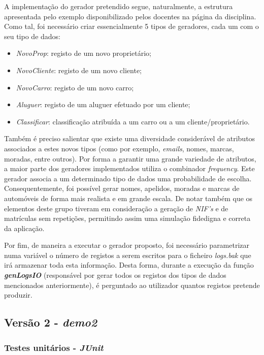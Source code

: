 \documentclass[a4paper]{report}
\begin{document}
A implementação do gerador pretendido segue, naturalmente, a estrutura apresentada pelo exemplo disponibilizado pelos docentes na página da disciplina. Como tal, foi necessário criar essencialmente 5 tipos de geradores, cada um com o seu tipo de dados:
\begin{itemize}
    \item \textit{NovoProp}: registo de um novo proprietário;
    \item \textit{NovoCliente}: registo de um novo cliente;
    \item \textit{NovoCarro}: registo de um novo carro;
    \item \textit{Aluguer}: registo de um aluguer efetuado por um cliente;
    \item \textit{Classificar}: classificação atribuída a um carro ou a um cliente/proprietário.
\end{itemize}

Também é preciso salientar que existe uma diversidade considerável de atributos associados a estes novos tipos (como por exemplo, \textit{emails}, nomes, marcas, moradas, entre outros). Por forma a garantir uma grande variedade de atributos, a maior parte dos geradores implementados utiliza o combinador \textit{frequency}. Este gerador associa a um determinado tipo de dados uma probabilidade de escolha. Consequentemente, foi possível gerar nomes, apelidos, moradas e marcas de automóveis de forma mais realista e em grande escala. De notar também que os elementos deste grupo tiveram em consideração a geração de \textit{NIF's} e de matrículas sem repetições, permitindo assim uma simulação fidedigna e correta da aplicação.

Por fim, de maneira a executar o gerador proposto, foi necessário parametrizar numa variável o número de registos a serem escritos para o ficheiro \textit{logs.bak} que irá armazenar toda esta informação. Desta forma, durante a execução da função \textbf{\textit{genLogsIO}} (responsável por gerar todos os registos dos tipos de dados mencionados anteriormente), é perguntado ao utilizador quantos registos pretende produzir.

\subsection{Versão 2 - \textit{demo2}}

\subsubsection{Testes unitários - \textit{JUnit}}
\end{document}
